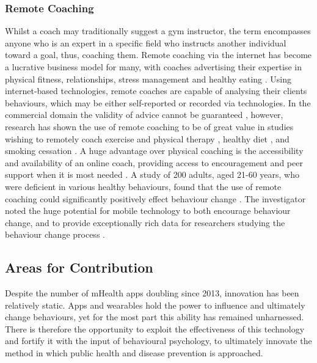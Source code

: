 \subsubsection{Remote Coaching}
Whilst a coach may traditionally suggest a gym instructor, the term encompasses anyone who is an expert in a specific field who instructs another individual toward a goal, thus, coaching them. Remote coaching via the internet has become a lucrative business model for many, with coaches advertising their expertise in physical fitness, relationships, stress management and healthy eating \cite{Smith2014a, rossett2005if}. Using internet-based technologies, remote coaches are capable of analysing their clients behaviours, which may be either self-reported or recorded via technologies\cite{Jimison2015,eemcs22577,kyfonidis2015future}.
In the commercial domain the validity of advice cannot be guaranteed \cite{Smith2014a}, however, research has shown the use of remote coaching to be of great value in studies wishing to remotely coach exercise and physical therapy \cite{Jimison2015,Geraedts2013,Spring2012}, healthy diet \cite{Spring2012}, and smoking cessation \cite{Sforzo2014}.
A huge advantage over physical coaching is the accessibility and availability of an online coach, providing access to encouragement and peer support when it is most needed \cite{kyfonidis2015future}. A study of 200 adults, aged 21-60 years, who were deficient in various healthy behaviours, found that the use of remote coaching could significantly positively effect behaviour change \cite{Nothwehr2013}. The investigator \citeauthor{Nothwehr2013} noted the huge potential for mobile technology to both encourage behaviour change, and to provide exceptionally rich data for researchers studying the behaviour change process \cite{Nothwehr2013}.

\subsection{Areas for Contribution}
Despite the number of mHealth apps doubling since 2013, innovation has been relatively static. Apps and wearables hold the power to influence and ultimately change behaviours, yet for the most part this ability has remained unharnessed.
There is therefore the opportunity to exploit the effectiveness of this technology and fortify it with the input of behavioural psychology, to ultimately innovate the method in which public health and disease prevention is approached.

